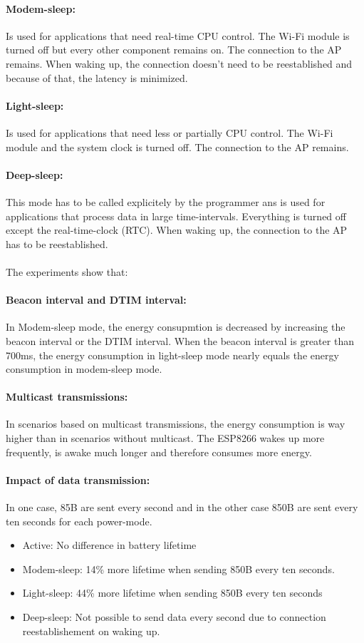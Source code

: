 \documentclass{report}
\begin{document}
\paragraph{Modem-sleep:} Is used for applications that need real-time CPU control. The Wi-Fi module is turned off but every other component remains on. The connection to the AP remains. When waking up, the connection doesn't need to be reestablished and because of that, the latency is minimized.
\paragraph{Light-sleep:} Is used for applications that need less or partially CPU control. The Wi-Fi module and the system clock is turned off. The connection to the AP remains.
\paragraph{Deep-sleep:} This mode has to be called explicitely by the programmer ans is used for applications that process data in large time-intervals. Everything is turned off except the real-time-clock (RTC). When waking up, the connection to the AP has to be reestablished.\\\\
The experiments show that:
\paragraph{Beacon interval and DTIM interval:} 
In Modem-sleep mode, the energy consupmtion is decreased by increasing the beacon interval or the DTIM interval. When the beacon interval is greater than 700ms, the energy consumption in light-sleep mode nearly equals the energy consumption in modem-sleep mode.
\paragraph{Multicast transmissions:}
In scenarios based on multicast transmissions, the energy consumption is way higher than in scenarios without multicast. The ESP8266 wakes up more frequently, is awake much longer and therefore consumes more energy.
\paragraph{Impact of data transmission:}
In one case, 85B are sent every second and in the other case 850B are sent every ten seconds for each power-mode.
\begin{itemize}
        \item Active: No difference in battery lifetime
        \item Modem-sleep: 14\% more lifetime when sending 850B every ten seconds.
        \item Light-sleep: 44\% more lifetime when sending 850B every ten seconds
        \item Deep-sleep: Not possible to send data every second due to connection reestablishement on waking up.
    \end{itemize}
\end{document}
